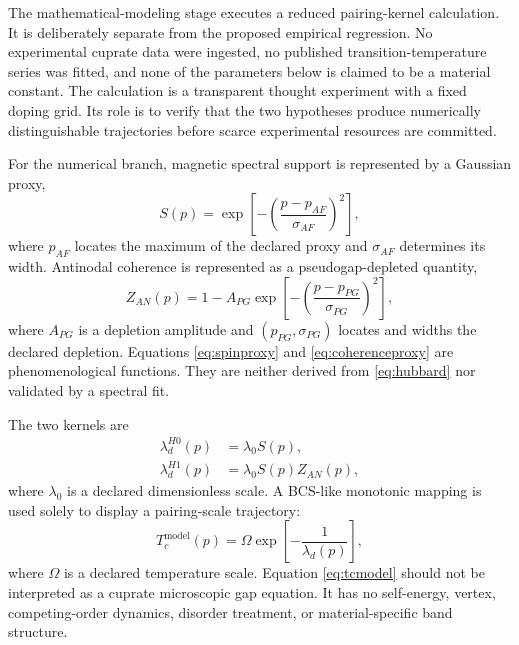 \documentclass[conference]{IEEEtran}
\begin{document}
The mathematical-modeling stage executes a reduced pairing-kernel calculation. It is deliberately separate from the proposed empirical regression. No experimental cuprate data were ingested, no published transition-temperature series was fitted, and none of the parameters below is claimed to be a material constant. The calculation is a transparent thought experiment with a fixed doping grid. Its role is to verify that the two hypotheses produce numerically distinguishable trajectories before scarce experimental resources are committed.

For the numerical branch, magnetic spectral support is represented by a Gaussian proxy,
\begin{equation}
S(p)=\exp\left[-\left(\frac{p-p_{AF}}{\sigma_{AF}}\right)^2\right],
\label{eq:spinproxy}
\end{equation}
where $p_{AF}$ locates the maximum of the declared proxy and $\sigma_{AF}$ determines its width. Antinodal coherence is represented as a pseudogap-depleted quantity,
\begin{equation}
Z_{AN}(p)=1-A_{PG}\exp\left[-\left(\frac{p-p_{PG}}{\sigma_{PG}}\right)^2\right],
\label{eq:coherenceproxy}
\end{equation}
where $A_{PG}$ is a depletion amplitude and $(p_{PG},\sigma_{PG})$ locates and widths the declared depletion. Equations \eqref{eq:spinproxy} and \eqref{eq:coherenceproxy} are phenomenological functions. They are neither derived from \eqref{eq:hubbard} nor validated by a spectral fit.

The two kernels are
\begin{align}
\lambda_d^{H0}(p)&=\lambda_0S(p),\label{eq:kernelh0}\\
\lambda_d^{H1}(p)&=\lambda_0S(p)Z_{AN}(p),\label{eq:kernelh1}
\end{align}
where $\lambda_0$ is a declared dimensionless scale. A BCS-like monotonic mapping is used solely to display a pairing-scale trajectory:
\begin{equation}
T_{c}^{\mathrm{model}}(p)=\Omega\exp\left[-\frac{1}{\lambda_d(p)}\right],
\label{eq:tcmodel}
\end{equation}
where $\Omega$ is a declared temperature scale. Equation \eqref{eq:tcmodel} should not be interpreted as a cuprate microscopic gap equation. It has no self-energy, vertex, competing-order dynamics, disorder treatment, or material-specific band structure.
\end{document}
